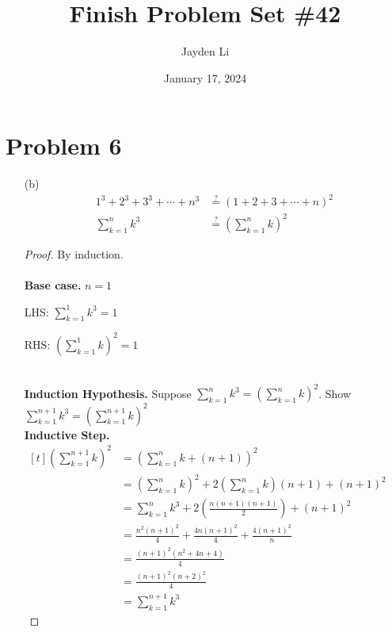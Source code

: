 \documentclass{article}
\title{Finish Problem Set \#42}
\author{Jayden Li}
\date{January 17, 2024}
\begin{document}

\fontsize{12pt}{12pt}\selectfont

\maketitle

\section*{Problem 6}
\begin{itemize}
\item[(b)]
\begin{align*}
	1^3+2^3+3^3+\cdots+n^3&\stackrel{?}{=}(1+2+3+\cdots+n)^2 \\
	\sum_{k=1}^{n}k^3&\stackrel{?}{=}\left(\sum_{k=1}^{n}k\right)^2
\end{align*}
\begin{proof}
	By induction. \\ \\
	\textbf{Base case.} $n=1$ \\
	\begin{minipage}[t]{0.2\linewidth}
		LHS: $\displaystyle \sum_{k=1}^{1}k^3=1$
	\end{minipage}
	\begin{minipage}[t]{0.3\linewidth}
		RHS: $\displaystyle \left(\sum_{k=1}^{1}k\right)^2=1$
	\end{minipage}
	\\
	\textbf{Induction Hypothesis.} Suppose $\displaystyle
	\sum_{k=1}^{n}k^3=\left(\sum_{k=1}^{n}k\right)^2$. Show
	$\displaystyle \sum_{k=1}^{n+1}k^3=\left(\sum_{k=1}^{n+1}k
	\right)^2$
	\\
	\textbf{Inductive Step.}
	$\begin{aligned}[t]
		\left(\sum_{k=1}^{n+1}k\right)^2
		&=\left(\sum_{k=1}^{n}k+(n+1)\right)^2 \\
		&=\left(\sum_{k=1}^{n}k\right)^2+
			2\left(\sum_{k=1}^{n}k\right)(n+1)+(n+1)^2 \\
		&=\sum_{k=1}^{n}k^3+2\left(\frac{n(n+1)(n+1)}{2}\right)+
			(n+1)^2 \\
		&=\frac{n^2(n+1)^2}{4}+\frac{4n(n+1)^2}{4}+\frac{4(n+1)^2}{n} \\
		&=\frac{(n+1)^2\left(n^2+4n+4\right)}{4} \\
		&=\frac{(n+1)^2(n+2)^2}{4} \\
		&=\sum_{k=1}^{n+1}k^3
	\end{aligned}$ \\
\end{proof}


\end{itemize}
\end{document}
